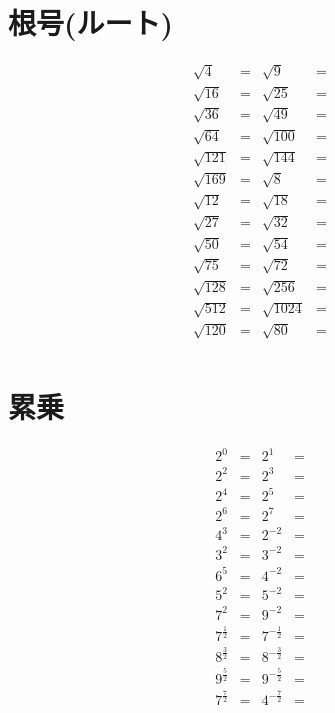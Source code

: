 \documentclass[paper=b4j,landscape,twocolumn,fleqn]{jlreq}
\begin{document}
\section{根号(ルート)}
\begin{align*}
  \sqrt{4} &= & \sqrt{9} &=\\
  \sqrt{16} &= & \sqrt{25} &=\\
  \sqrt{36} &= & \sqrt{49} &=\\
  \sqrt{64} &= & \sqrt{100} &=\\
  \sqrt{121} &= & \sqrt{144} &=\\
  \sqrt{169} &= & \sqrt{8} &=\\
  \sqrt{12} &= & \sqrt{18} &=\\
  \sqrt{27} &= & \sqrt{32} &=\\
  \sqrt{50} &= & \sqrt{54} &=\\
  \sqrt{75} &= & \sqrt{72} &=\\
  \sqrt{128} &= & \sqrt{256} &=\\
  \sqrt{512} &= & \sqrt{1024} &=\\
  \sqrt{120} &= & \sqrt{80} &=\\
\end{align*}
\section{累乗}
\begin{align*}
  2^0 &= & 2^1 &=\\
  2^2 &= & 2^3 &=\\
  2^4 &= & 2^5 &=\\
  2^6 &= & 2^7 &=\\
  4^3 &= & 2^{-2} &=\\
  3^2 &= & 3^{-2} &=\\
  6^5 &= & 4^{-2} &=\\
  5^2 &= & 5^{-2} &=\\
  7^2 &= & 9^{-2} &=\\
  7^{\frac{1}{2}} &= & 7^{-\frac{1}{2}} &=\\
  8^{\frac{3}{2}} &= & 8^{-\frac{3}{2}} &=\\
  9^{\frac{5}{2}} &= & 9^{-\frac{5}{2}} &=\\
  7^{\frac{7}{2}} &= & 4^{-\frac{7}{2}} &=\\
\end{align*}


\newpage
\end{document}

